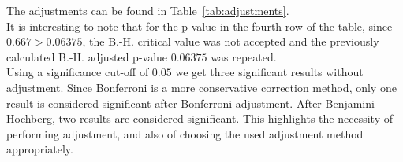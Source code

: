 The adjustments can be found in Table~\ref{tab:adjustments}.\\
It is interesting to note that for the p-value in the fourth row of the table, since $0.667>0.06375$, the B.-H. critical value was not accepted and the previously calculated B.-H. adjusted p-value $0.06375$ was repeated.\\

Using a significance cut-off of $0.05$ we get three significant results without adjustment. Since Bonferroni is a more conservative correction method, only one result is considered significant after Bonferroni adjustment. After Benjamini-Hochberg, two results are considered significant. This highlights the necessity of performing adjustment, and also of choosing the used adjustment method appropriately.
